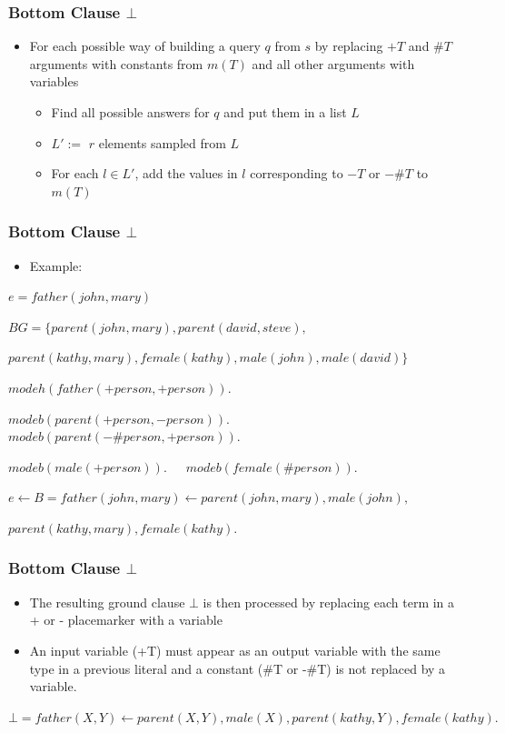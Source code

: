 \documentclass[trans,aspectratio=1610]{beamer}
\begin{document}
\begin{frame}
\frametitle{Bottom Clause $\bot$}

\begin{itemize}
\item For each possible way of building a query $q$ from $s$ by replacing $+T$ and $\#T$ arguments with constants from $m(T)$ and all other arguments with variables
\begin{itemize}
\item Find all possible answers for $q$ and put them in a list $L$
\item $L':=$ $r$ elements sampled from $L$
\item For each $l\in L'$, add the values in $l$ corresponding to $-T$ or $-\#T$ to $m(T)$
\end{itemize}
\end{itemize}
\end{frame}

\begin{frame}
\frametitle{Bottom Clause $\bot$}
\begin{itemize}
\item Example:
\end{itemize}
$e=father(john,mary)$

$BG=\{parent(john,mary), parent(david,steve),$

$parent(kathy,mary), female(kathy),male(john),  male(david)\}$

$modeh(father(+person,+person)).$

$modeb(parent(+person,-person)).$ \ \ \ $modeb(parent(-\#person,+person)).$

$modeb(male(+person)).$\ \ \ $modeb(female(\#person)).$

$e\leftarrow B=father(john,mary)\leftarrow parent(john,mary),male(john),$

$parent(kathy,mary),female(kathy).$
\end{frame}

\begin{frame}
\frametitle{Bottom Clause $\bot$}
\begin{itemize}
\item The resulting ground clause $\bot$ is then processed by replacing each term in a + or - placemarker with a variable
\item An input variable (+T) must appear as an output variable with the same type in a previous literal and a constant (\#T or -\#T) is not replaced by a variable.
\end{itemize}
$\bot=father(X,Y)\leftarrow parent(X,Y),male(X),parent(kathy,Y),female(kathy).$

\end{frame}
\end{document}
